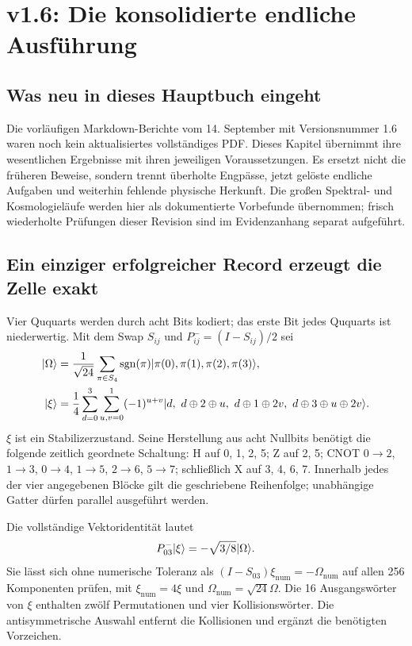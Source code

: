 \chapter{v1.6: Die konsolidierte endliche Ausführung}
\label{ch:v16-labor}
\section{Was neu in dieses Hauptbuch eingeht}
Die vorläufigen Markdown-Berichte vom 14. September mit Versionsnummer 1.6 waren noch kein aktualisiertes vollständiges PDF. Dieses Kapitel übernimmt ihre wesentlichen Ergebnisse mit ihren jeweiligen Voraussetzungen. Es ersetzt nicht die früheren Beweise, sondern trennt überholte Engpässe, jetzt gelöste endliche Aufgaben und weiterhin fehlende physische Herkunft. Die großen Spektral- und Kosmologieläufe werden hier als dokumentierte Vorbefunde übernommen; frisch wiederholte Prüfungen dieser Revision sind im Evidenzanhang separat aufgeführt. 

\section{Ein einziger erfolgreicher Record erzeugt die Zelle exakt}
Vier Ququarts werden durch acht Bits kodiert; das erste Bit jedes Ququarts ist niederwertig. Mit dem Swap $S_{ij}$ und $P^-_{ij}=(I-S_{ij})/2$ sei
\begin{align}
\lvert\Omega\rangle&=\frac1{\sqrt{24}}\sum_{\pi\in S_4}\operatorname{sgn}(\pi)
\lvert\pi(0),\pi(1),\pi(2),\pi(3)\rangle,\\
\lvert\xi\rangle&=\frac14\sum_{d=0}^3\sum_{u,v=0}^1(-1)^{u+v}
\lvert d,\ d\oplus2\oplus u,\ d\oplus1\oplus2v,\ d\oplus3\oplus u\oplus2v\rangle.
\end{align}
$\xi$ ist ein Stabilizerzustand. Seine Herstellung aus acht Nullbits benötigt die folgende zeitlich geordnete Schaltung: H auf 0, 1, 2, 5; Z auf 2, 5; CNOT $0\to2$, $1\to3$, $0\to4$, $1\to5$, $2\to6$, $5\to7$; schließlich X auf 3, 4, 6, 7. Innerhalb jedes der vier angegebenen Blöcke gilt die geschriebene Reihenfolge; unabhängige Gatter dürfen parallel ausgeführt werden.

Die vollständige Vektoridentität lautet
\begin{equation}
P^-_{03}\lvert\xi\rangle=-\sqrt{3/8}\lvert\Omega\rangle.
\label{eq:v16-seed}
\end{equation}
Sie lässt sich ohne numerische Toleranz als $(I-S_{03})\xi_{\mathrm{num}}=-\Omega_{\mathrm{num}}$ auf allen 256 Komponenten prüfen, mit $\xi_{\mathrm{num}}=4\xi$ und $\Omega_{\mathrm{num}}=\sqrt{24}\Omega$. Die 16 Ausgangswörter von $\xi$ enthalten zwölf Permutationen und vier Kollisionswörter. Die antisymmetrische Auswahl entfernt die Kollisionen und ergänzt die benötigten Vorzeichen.

